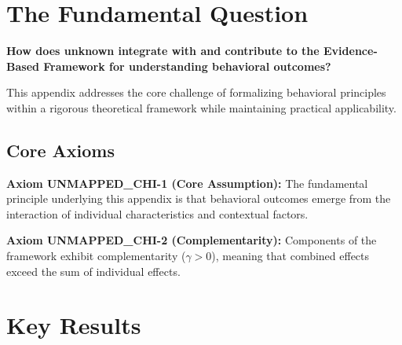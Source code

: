 \documentclass[11pt]{article}
\begin{document}

\section{The Fundamental Question}
\label{sec:chi-fundamental}

\begin{tcolorbox}[
    colback=red!5!white,
    colframe=red!75!black,
    title={\textbf{Fundamental Question}}
]
\textbf{How does unknown integrate with and contribute to the
Evidence-Based Framework for understanding behavioral outcomes?}

This appendix addresses the core challenge of formalizing behavioral principles
within a rigorous theoretical framework while maintaining practical applicability.
\end{tcolorbox}



\subsection{Core Axioms}
\label{sec:chi-axioms}

\begin{tcolorbox}[colback=yellow!5!white,colframe=yellow!75!black,title=Axiom UNMAPPED_CHI-1: Fundamental Principle]
\textbf{Axiom UNMAPPED_CHI-1 (Core Assumption):}
The fundamental principle underlying this appendix is that behavioral outcomes
emerge from the interaction of individual characteristics and contextual factors.
\end{tcolorbox}

\begin{tcolorbox}[colback=yellow!5!white,colframe=yellow!75!black,title=Axiom UNMAPPED_CHI-2: Complementarity]
\textbf{Axiom UNMAPPED_CHI-2 (Complementarity):}
Components of the framework exhibit complementarity ($\gamma > 0$), meaning
that combined effects exceed the sum of individual effects.
\end{tcolorbox}


\section{Key Results}
\label{sec:chi-results}
\end{document}
